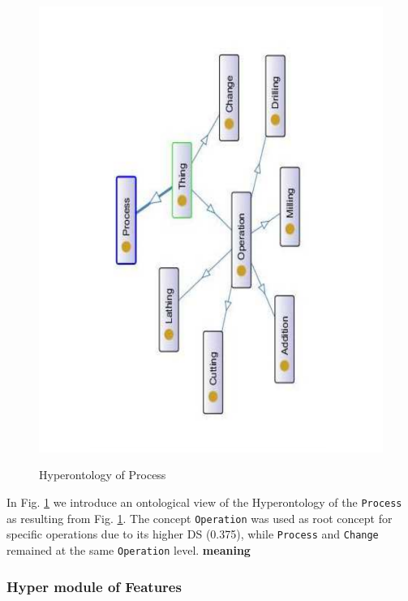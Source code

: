 \begin{figure}
\begin{center}
	\includegraphics[scale=0.5, angle=270]{figure-chapterIV/fig4-21}\\
	\vspace{-40}
	\caption{Hyperontology of Process}
	
	\label{figure4-21}
\end{center}
\end{figure}

In Fig. \ref{figure4-21} we introduce an ontological view of the Hyperontology of the \texttt{Process} as resulting from Fig. \ref{figure4-21}. The concept \texttt{Operation} was used as root concept for specific operations due to its higher DS (0.375), while \texttt{Process} and \texttt{Change} remained  at the same \texttt{Operation} level. \textbf{meaning}

\subsubsection{Hyper module of Features}\label{subsubsection4.2.5.4}



